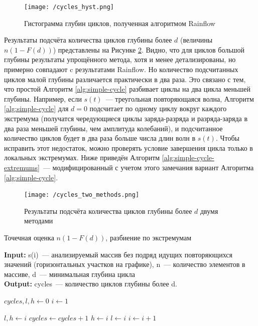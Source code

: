 \documentclass{report}
\begin{document}
\begin{figure}[h]
\texttt{[image: /cycles\_hyst.png]}
\caption{Гистограмма глубин циклов, полученная алгоритмом Rainflow}
\centering
\label{fig:cycles-hyst}
\end{figure}

Результаты подсчёта количества циклов глубины более $d$ (величины $n(1 - F(d))$) представлены на Рисунке \ref{fig:cycles-two-methods}.
Видно, что для циклов большой глубины результаты упрощённого метода, хотя и менее детализированы, но примерно совпадают c результатами Rainflow.
Но количество подсчитанных циклов малой глубины различается практически в два раза.
Это связано с тем, что простой Алгоритм \ref{alg:simple-cycle} разбивает циклы на два цикла меньшей глубины.
Например, если $s(t)$~--- треугольная повторяющаяся волна, Алгоритм \ref{alg:simple-cycle} для $d=0$ подсчитает по одному циклу вокруг каждого экстремума (получатся чередующиеся циклы заряда-разряда и разряда-заряда в два раза меньшей глубины, чем амплитуда колебаний), и подсчитанное количество циклов будет в два раза больше числа длин волн в $s(t)$.
Чтобы исправить этот недостаток, можно проверять условие завершения цикла только в локальных экстремумах.
Ниже приведён Алгоритм \ref{alg:simple-cycle-extremums}~--- модифицированный с учетом этого замечания вариант Алгоритма \ref{alg:simple-cycle}.



\begin{figure}[h]
\texttt{[image: /cycles\_two\_methods.png]}
\caption{Результаты подсчёта количества циклов глубины более $d$ двумя методами}
\centering
\label{fig:cycles-two-methods}
\end{figure}


\begin{algorithm}
\caption{Точечная оценка $n(1 - F(d))$, разбиение по экстремумам} \label{alg:simple-cycle-extremums}
\hspace*{\algorithmicindent} \textbf{Input:} s(i)~--- анализируемый массив без подряд идущих повторяющихся значений (горизонтальных участков на графике), n~--- количество элементов в массиве, d~--- минимальная глубина цикла \\
\hspace*{\algorithmicindent} \textbf{Output:} cycles~--- количество циклов глубины более d.

\begin{algorithmic}[1]
\State $cycles, l, h \gets 0$
\State $i \gets 1$


        \State $l,h \gets i$
        \State $cycles \gets cycles +1$
    \Else
            \State $h \gets i$
        \EndIf
            \State $l \gets i$
        \EndIf
    \EndIf
\EndIf
\State $i \gets i+1$
\EndWhile
 
\end{algorithmic}
\end{algorithm}
\end{document}
